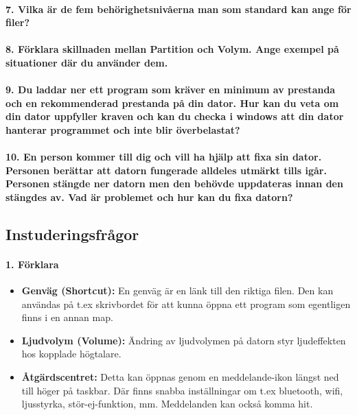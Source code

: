 \paragraph{7. Vilka är de fem behörighetsnivåerna man som standard kan ange för filer?}

\paragraph{8. Förklara skillnaden mellan Partition och Volym. Ange exempel på situationer där du använder dem.}

\paragraph{9. Du laddar ner ett program som kräver en minimum av prestanda och en rekommenderad prestanda på din dator. Hur kan du veta om din dator uppfyller kraven och kan du checka i windows att din dator hanterar programmet och inte blir överbelastat?}

\paragraph{10. En person kommer till dig och vill ha hjälp att fixa sin dator. Personen berättar att datorn fungerade alldeles utmärkt tills igår. Personen stängde ner datorn men den behövde uppdateras innan den stängdes av. Vad är problemet och hur kan du fixa datorn?}

\newpage
\subsection{Instuderingsfrågor}

\paragraph{1. Förklara}
\begin{itemize}
	\item \textbf{Genväg (Shortcut):} En genväg är en länk till den riktiga filen. Den kan användas på t.ex skrivbordet för att kunna öppna ett program som egentligen finns i en annan map.
	\item \textbf{Ljudvolym (Volume):} Ändring av ljudvolymen på datorn styr ljudeffekten hos kopplade högtalare.
	\item \textbf{Åtgärdscentret:} Detta kan öppnas genom en meddelande-ikon längst ned till höger på taskbar. Där finns snabba inställningar om t.ex bluetooth, wifi, ljusstyrka, stör-ej-funktion, mm. Meddelanden kan också komma hit.
\end{itemize}

